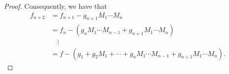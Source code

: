 \documentclass[12pt]{amsart}
\theoremstyle{remark}
\numberwithin{equation}{section}
\begin{document}
\begin{proof}
Consequently, 
we have that 
\begin{align}
\label{1st_part_surj}
f_{n+2}&=f_{n+1}-g_{n+1}M_{1}\cdots M_{n} \\
&= f_{n}-(g_{n}M_{1}\cdots M_{n-1}+g_{n+1}M_{1}\cdots M_{n}) \nonumber \\
&\quad \vdots \nonumber \\
&=f-(g_{1}+g_{2}M_{1}+\cdots +g_{n}M_{1}\cdots M_{n-1} +g_{n+1}M_{1}\cdots M_{n}). \nonumber
\end{align}


\end{proof}
\end{document}
